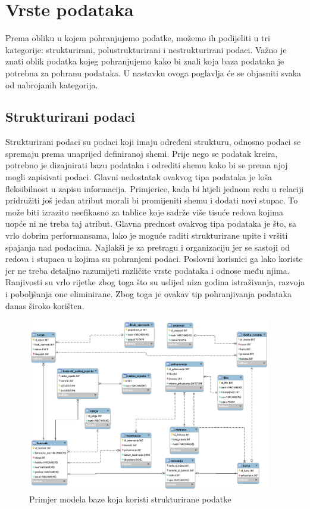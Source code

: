\documentclass{foi}
\begin{document}
\section{Vrste podataka}

Prema obliku u kojem pohranjujemo podatke, možemo ih podijeliti u tri kategorije: strukturirani, polustrukturirani i nestrukturirani podaci. Važno je znati oblik podatka kojeg pohranjujemo kako bi znali koja baza podataka je potrebna za pohranu podataka. \cite{dataEngineerStudyGuide}  U nastavku ovoga poglavlja će se objasniti svaka od nabrojanih kategorija.

\subsection{Strukturirani podaci}

Strukturirani podaci su podaci koji imaju određeni strukturu, odnosno podaci se spremaju prema unaprijed definiranoj shemi. Prije nego se podatak kreira, potrebno je dizajnirati bazu podataka i odrediti shemu kako bi se prema njoj mogli zapisivati podaci. Glavni nedostatak ovakvog tipa podataka je loša fleksibilnost u zapisu informacija. Primjerice, kada bi htjeli jednom redu u relaciji pridružiti još jedan atribut morali bi promijeniti shemu i dodati novi stupac. To može biti izrazito neefikasno za tablice koje sadrže više tisuće redova kojima uopće ni ne treba taj atribut. Glavna prednost ovakvog tipa podataka je što, sa vrlo dobrim performansama, lako je moguće raditi strukturirane upite i vršiti spajanja nad podacima. Najlakši je za pretragu i organizaciju jer se sastoji od redova i stupaca u kojima su pohranjeni podaci. Poslovni korisnici ga lako koriste jer ne treba detaljno razumijeti različite vrste podataka i odnose među njima. Ranjivosti su vrlo rijetke zbog toga što su uslijed niza godina istraživanja, razvoja i poboljšanja one eliminirane. Zbog toga je ovakav tip pohranjivanja podataka danas široko korišten. \cite{unstructuredStructuredSemiStructured}

\begin{figure}[h!]
    \centering
    \includegraphics[width=0.95\textwidth]{slike/strukturirani.png}
    \caption{Primjer modela baze koja koristi strukturirane podatke}
    \label{strukturirani}
\end{figure}
\end{document}
